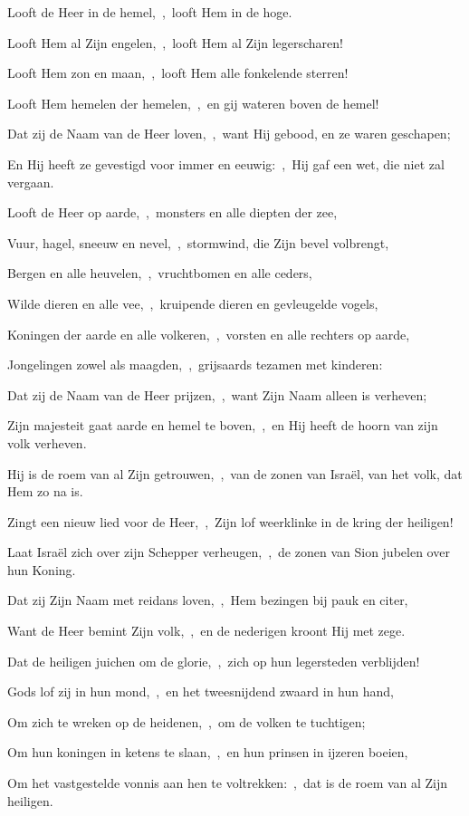 \documentclass[12pt,twoside,a5paper]{article}
\begin{document}
\begin{halfparskip}
   Looft de Heer in de hemel,~\sep\ looft Hem in de hoge.

  Looft Hem al Zijn engelen,~\sep\ looft Hem al Zijn legerscharen!

  Looft Hem zon en maan,~\sep\ looft Hem alle fonkelende sterren!

  Looft Hem hemelen der hemelen,~\sep\ en gij wateren boven de hemel!

  Dat zij de Naam van de Heer loven,~\sep\ want Hij gebood, en ze waren geschapen;

  En Hij heeft ze gevestigd voor immer en eeuwig:~\sep\ Hij gaf een wet, die niet zal vergaan.

  Looft de Heer op aarde,~\sep\ monsters en alle diepten der zee,

  Vuur, hagel, sneeuw en nevel,~\sep\ stormwind, die Zijn bevel volbrengt,

  Bergen en alle heuvelen,~\sep\ vruchtbomen en alle ceders,

  Wilde dieren en alle vee,~\sep\ kruipende dieren en gevleugelde vogels,

  Koningen der aarde en alle volkeren,~\sep\ vorsten en alle rechters op aarde,

  Jongelingen zowel als maagden,~\sep\ grijsaards tezamen met kinderen:

  Dat zij de Naam van de Heer prijzen,~\sep\ want Zijn Naam alleen is verheven;

  Zijn majesteit gaat aarde en hemel te boven,~\sep\ en Hij heeft de hoorn van zijn volk verheven.

  Hij is de roem van al Zijn getrouwen,~\sep\ van de zonen van Israël, van het volk, dat Hem zo na is.
\end{halfparskip}

\begin{halfparskip}
   Zingt een nieuw lied voor de Heer,~\sep\ Zijn lof weerklinke in de kring der heiligen!

  Laat Israël zich over zijn Schepper verheugen,~\sep\ de zonen van Sion jubelen over hun Koning.

  Dat zij Zijn Naam met reidans loven,~\sep\ Hem bezingen bij pauk en citer,

  Want de Heer bemint Zijn volk,~\sep\ en de nederigen kroont Hij met zege.

  Dat de heiligen juichen om de glorie,~\sep\ zich op hun legersteden verblijden!

  Gods lof zij in hun mond,~\sep\ en het tweesnijdend zwaard in hun hand,

  Om zich te wreken op de heidenen,~\sep\ om de volken te tuchtigen;

  Om hun koningen in ketens te slaan,~\sep\ en hun prinsen in ijzeren boeien,

  Om het vastgestelde vonnis aan hen te voltrekken:~\sep\ dat is de roem van al Zijn heiligen.
\end{halfparskip}
\end{document}
